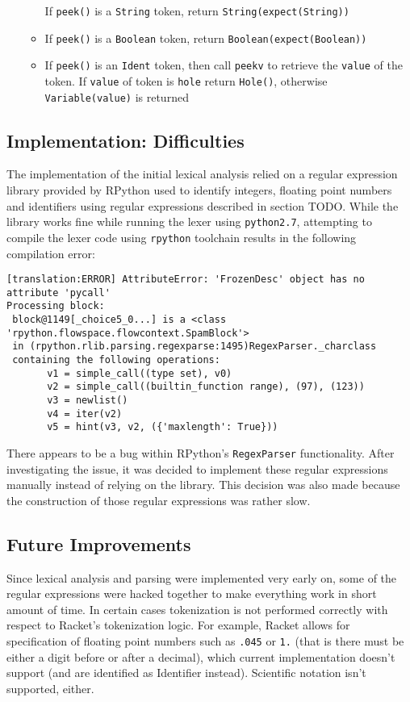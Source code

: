 \begin{itemize}
\begin{itemize}
		If \texttt{peek()} is a \texttt{String} token, return \texttt{String(expect(String))}
	\item
		If \texttt{peek()} is a \texttt{Boolean} token, return \texttt{Boolean(expect(Boolean))}
	\item

		If \texttt{peek()} is an \texttt{Ident} token, then call \texttt{peekv} to retrieve the \texttt{value} of the token. If \texttt{value} of token is \texttt{hole} return \texttt{Hole()}, otherwise \texttt{Variable(value)} is returned
	\end{itemize}
	

\end{itemize}

\subsection{Implementation: Difficulties}
The implementation of the initial lexical analysis relied on a regular expression library provided by RPython used to identify integers, floating point numbers and identifiers using regular expressions described in section TODO. While the library works fine while running the lexer using \texttt{python2.7}, attempting to compile the lexer code using \texttt{rpython} toolchain results in the following compilation error:

\begin{verbatim}
[translation:ERROR] AttributeError: 'FrozenDesc' object has no attribute 'pycall'
Processing block:
 block@1149[_choice5_0...] is a <class 'rpython.flowspace.flowcontext.SpamBlock'> 
 in (rpython.rlib.parsing.regexparse:1495)RegexParser._charclass 
 containing the following operations: 
       v1 = simple_call((type set), v0) 
       v2 = simple_call((builtin_function range), (97), (123)) 
       v3 = newlist() 
       v4 = iter(v2) 
       v5 = hint(v3, v2, ({'maxlength': True})) 
\end{verbatim}

There appears to be a bug within RPython's \texttt{RegexParser} functionality. After investigating the issue, it was decided to implement these regular expressions manually instead of relying on the library. This decision was also made because the construction of those regular expressions was rather slow.

\subsection{Future Improvements}

Since lexical analysis and parsing were implemented very early on, some of the regular expressions were hacked together to make everything work in short amount of time. In certain cases tokenization is not performed correctly with respect to Racket's tokenization logic. For example, Racket allows for specification of floating point numbers such as \texttt{.045} or \texttt{1.} (that is there must be either a digit before or after a decimal), which current implementation doesn't support (and are identified as Identifier instead). Scientific notation isn't supported, either.

